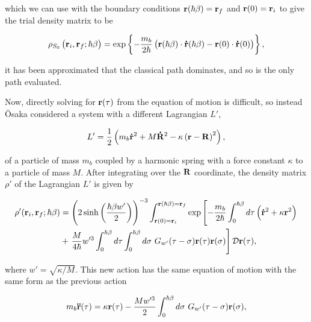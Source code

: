 which we can use with the boundary conditions $\vb{r}(\hbar\beta) = \vb{r}_f$ and $\vb{r}(0) = \vb{r}_i$ to give the trial density matrix to be

\begin{equation}
    \rho_{S_0}\left(\vb{r}_i, \vb{r}_f; \hbar\beta\right) = \exp \left\{-\frac{m_b}{2\hbar}\left( \vb{r}(\hbar\beta) \cdot \vb{\dot{r}}(\hbar\beta) - \vb{r}(0) \cdot \vb{\dot{r}}(0) \right)\right\},
\end{equation}

it has been approximated that the classical path dominates, and so is the only path evaluated. 

Now, directly solving for $\vb{r}(\tau)$ from the equation of motion is difficult, so instead \"Osaka considered a system with a different Lagrangian $L'$,

\begin{equation}
    L' = \frac{1}{2} \left( m_b\vb{\dot{r}}^2 + M\vb{\dot{R}}^2 - \kappa \left( \vb{r} - \vb{R} \right)^2 \right),
\end{equation}

of a particle of mass $m_b$ coupled by a harmonic spring with a force constant $\kappa$ to a particle of mass $M$. After integrating over the $\vb{R}$ coordinate, the density matrix $\rho'$ of the Lagrangian $L'$ is given by

\begin{equation}
    \begin{aligned}
        \rho'(\vb{r}_i, \vb{r}_f; \hbar\beta) &= \left(2 \sinh\left(\frac{\hbar\beta w'}{2}\right)\right)^{-3} \int_{\vb{r}(0) = \vb{r}_i}^{\vb{r}(\hbar\beta) = \vb{r}_f} \exp \left[-\frac{m_b}{2\hbar} \int_0^{\hbar\beta} d\tau \left(\vb{\dot{r}}^2 + \kappa \vb{r}^2\right)\right. \\
        &+ \left.\frac{M}{4\hbar} w'^3 \int^{\hbar\beta}_0 d\tau \int^{\hbar\beta}_0 d\sigma\ G_{w'}(\tau - \sigma) \vb{r}(\tau) \vb{r}(\sigma) \right] \mathcal{D}\vb{r}(\tau),
    \end{aligned}
\end{equation}

where $w' = \sqrt{\kappa / M}$. This new action has the same equation of motion with the same form as the previous action

\begin{equation}\label{eqn:osaka_eom}
    m_b \vb{\ddot{r}}(\tau) = \kappa \vb{r}(\tau) - \frac{Mw'^3}{2} \int^{\hbar\beta}_0 d\sigma\ G_{w'}(\tau - \sigma) \vb{r}(\sigma),
\end{equation}

